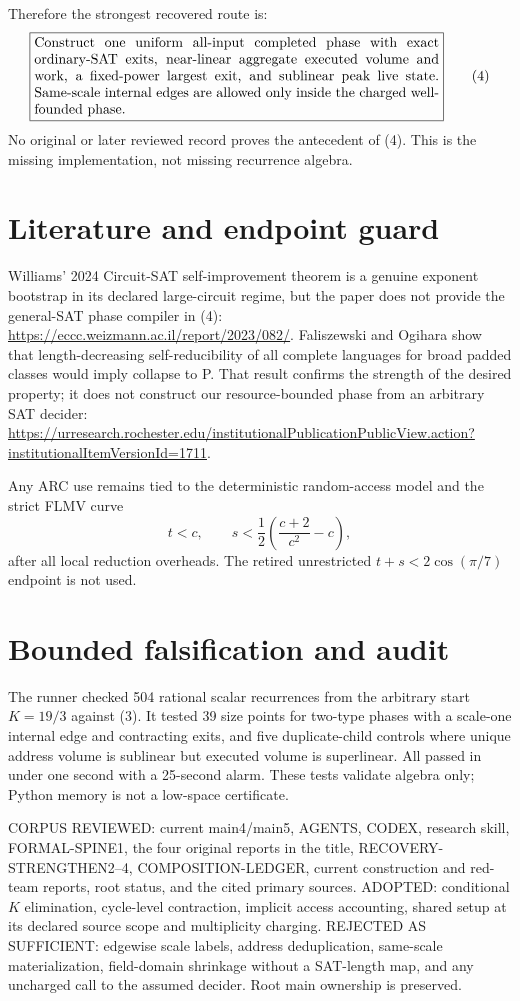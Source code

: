 \documentclass[11pt]{article}
\begin{document}
Therefore the strongest recovered route is:
\[
 \boxed{\begin{minipage}{.84\linewidth}
 Construct one uniform all-input completed phase with exact ordinary-SAT
 exits, near-linear aggregate executed volume and work, a fixed-power
 largest exit, and sublinear peak live state.  Same-scale internal edges are
 allowed only inside the charged well-founded phase.
 \end{minipage}} \tag{4}
\]
No original or later reviewed record proves the antecedent of (4).  This is
the missing implementation, not missing recurrence algebra.

\section{Literature and endpoint guard}
Williams' 2024 Circuit-SAT self-improvement theorem is a genuine exponent
bootstrap in its declared large-circuit regime, but the paper does not
provide the general-SAT phase compiler in (4):
\url{https://eccc.weizmann.ac.il/report/2023/082/}.
Faliszewski and Ogihara show that length-decreasing self-reducibility of all
complete languages for broad padded classes would imply collapse to P.  That
result confirms the strength of the desired property; it does not construct
our resource-bounded phase from an arbitrary SAT decider:
\url{https://urresearch.rochester.edu/institutionalPublicationPublicView.action?institutionalItemVersionId=1711}.

Any ARC use remains tied to the deterministic random-access model and the
strict FLMV curve
\[
 t<c,\qquad s<\frac12\left(\frac{c+2}{c^2}-c\right),
\]
after all local reduction overheads.  The retired unrestricted
$t+s<2\cos(\pi/7)$ endpoint is not used.

\section{Bounded falsification and audit}
The runner checked 504 rational scalar recurrences from the arbitrary start
$K=19/3$ against (3).  It tested 39 size points for two-type phases with a
scale-one internal edge and contracting exits, and five duplicate-child
controls where unique address volume is sublinear but executed volume is
superlinear.  All passed in under one second with a 25-second alarm.  These
tests validate algebra only; Python memory is not a low-space certificate.

CORPUS REVIEWED: current main4/main5, AGENTS, CODEX, research skill,
FORMAL-SPINE1, the four original reports in the title, RECOVERY-STRENGTHEN2--4,
COMPOSITION-LEDGER, current construction and red-team reports, root status,
and the cited primary sources.  ADOPTED: conditional $K$ elimination,
cycle-level contraction, implicit access accounting, shared setup at its
declared source scope and multiplicity charging.  REJECTED AS SUFFICIENT:
edgewise scale labels, address deduplication, same-scale materialization,
field-domain shrinkage without a SAT-length map, and any uncharged call to
the assumed decider.  Root main ownership is preserved.
\end{document}
